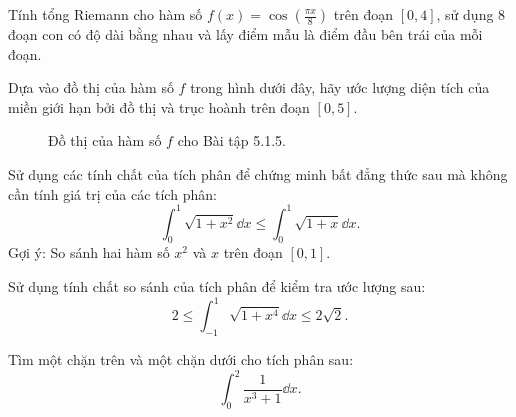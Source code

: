 \begin{exercise}
    Tính tổng Riemann cho hàm số $f(x) = \cos(\frac{\pi x}{8})$ trên đoạn $[0, 4]$, sử dụng 8 đoạn con có độ dài bằng nhau và lấy điểm mẫu là điểm đầu bên trái của mỗi đoạn.
\end{exercise}

\begin{exercise}
    Dựa vào đồ thị của hàm số $f$ trong hình dưới đây, hãy ước lượng diện tích của miền giới hạn bởi đồ thị và trục hoành trên đoạn $[0, 5]$.
    \begin{figure}[H]
        \centering
        \caption{Đồ thị của hàm số $f$ cho Bài tập 5.1.5.}
    \end{figure}
\end{exercise}

\begin{exercise}
    Sử dụng các tính chất của tích phân để chứng minh bất đẳng thức sau mà không cần tính giá trị của các tích phân:
    \[ \int_{0}^{1} \sqrt{1+x^2} \dd x \le \int_{0}^{1} \sqrt{1+x} \dd x. \]
    Gợi ý: So sánh hai hàm số $x^2$ và $x$ trên đoạn $[0, 1]$.
\end{exercise}

\begin{exercise}
    Sử dụng tính chất so sánh của tích phân để kiểm tra ước lượng sau:
    \[ 2 \le \int_{-1}^{1} \sqrt{1+x^4} \dd x \le 2\sqrt{2}. \]
\end{exercise}

\begin{exercise}
    Tìm một chặn trên và một chặn dưới cho tích phân sau:
    \[ \int_{0}^{2} \frac{1}{x^3+1} \dd x. \]
\end{exercise}

